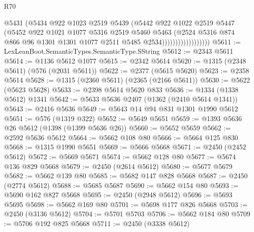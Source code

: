 \begin{lexlean}{R70}
\begin{coremodule}
                                @5431
                                (@5434
                                  @922
                                  @1023
                                  @2519
                                  @5439
                                  (@5442
                                    @922
                                    @1022
                                    @2519
                                    @5447
                                    (@5452
                                      @922
                                      @1021
                                      @1077
                                      @5316
                                      @2519
                                      @5460
                                      @5463
                                      (@2524
                                        @5316
                                        @874
                                        @866
                                        @96
                                        @1301
                                        @1301
                                        @1077
                                        @2511
                                        @5485
                                        @2534))))))))))))))))))
@5611 := LexLeanBoot.SemanticTypes.SemanticType.SString
@5612 := @2343 @5611
@5614 := @1136 @5612 @1077
@5615 := @2342 @5614
@5620 := @1315 (@2348 @5611) (@576 (@2031 @5611))
@5622 := @2377 (@5615 @5620)
@5623 := @2358 @5614
@5628 := @1315 (@2360 @5611) (@2365 (@2166 @5611))
@5630 := @5622 (@5623 @5628)
@5633 := @2398 @5614 @5620 @833
@5636 := @1334 (@1338 @5612) @1341
@5642 := @5633 @5636 @2407 (@1362 (@2410 @5614 @1341))
@5643 := @2416 @5636
@5649 := @5643 @14 @94 @831 @1301 @1990 @5612
@5651 := @576 (@1319 @322)
@5652 := @5649 @5651
@5659 := @1393 @5636 @26 @5612 (@1398 (@1399 @5636 @26))
@5660 := @5652 @5659
@5662 := @2592 @5636 @5612
@5664 := @5662 @108 @80
@5666 := @5664 @125 @830
@5668 := @1315 @1990 @5651
@5669 := @5666 @5668
@5671 := @2450 (@2452 @5612)
@5672 := @5669 @5671
@5674 := @5662 @128 @80
@5677 := @5674 @136 @829 @5668
@5679 := @2450 (@2614 @5612)
@5680 := @5677 @5679
@5682 := @5662 @139 @80
@5685 := @5682 @147 @828 @5668
@5687 := @2450 (@2774 @5612)
@5688 := @5685 @5687
@5690 := @5662 @154 @80
@5693 := @5690 @162 @827 @5668
@5695 := @2450 (@2948 @5612)
@5696 := @5693 @5695
@5698 := @5662 @169 @80
@5701 := @5698 @177 @826 @5668
@5703 := @2450 (@3136 @5612)
@5704 := @5701 @5703
@5706 := @5662 @184 @80
@5709 := @5706 @192 @825 @5668
@5711 := @2450 (@3338 @5612)

\end{coremodule}
\end{lexlean}
